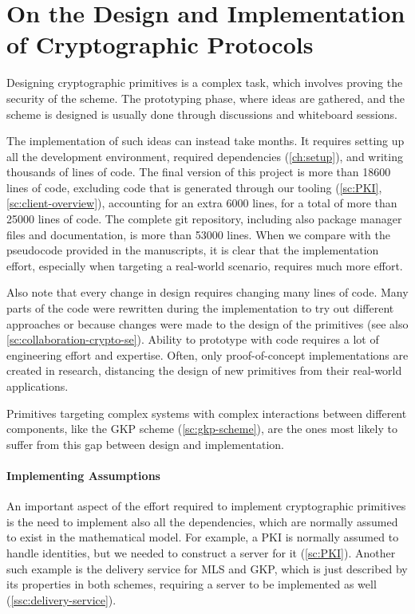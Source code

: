 \section{On the Design and Implementation of Cryptographic Protocols}\label{sc:gap-crypto-primitives-design-implementation}

Designing cryptographic primitives is a complex task,
which involves proving the security of the scheme. The prototyping phase, where ideas are gathered, 
and the scheme is designed is usually done through 
discussions and whiteboard sessions.

The implementation of such ideas can instead take months.
It requires setting up all the development environment,
required dependencies (\cref{ch:setup}), and writing thousands of lines of code.
The final version of this project 
is more than 18600 lines of code, excluding code that
is generated through our tooling (\cref{sc:PKI}, \cref{sc:client-overview}), 
accounting for an extra 6000 lines,
for a total of more than 25000 lines of code.
The complete git repository, including
also package manager files and documentation, 
is more than 53000 lines.
When we compare with the pseudocode provided in the manuscripts,
it is clear that the implementation effort, especially
when targeting a real-world scenario, requires much
more effort. 

Also note that every change in design requires
changing many lines of code. Many parts of the code
were rewritten during the implementation to try out
different approaches or because changes were made to the
design of the primitives (see also \cref{sc:collaboration-crypto-se}). 
Ability to prototype with
code requires a lot of engineering effort and
expertise. Often, only proof-of-concept
implementations are created in research,
distancing the design of new primitives from their
real-world applications.

Primitives targeting complex systems with complex interactions
between different components, like the GKP scheme (\cref{sc:gkp-scheme}), are the
ones most likely to suffer from this gap between design
and implementation.

\paragraph{Implementing Assumptions}
An important aspect of the effort required to implement
cryptographic primitives is the need to implement also
all the dependencies, which are normally assumed to exist
in the mathematical model. For example, a PKI is normally
assumed to handle identities, but we needed to construct a server for it (\cref{sc:PKI}).
Another such example is the delivery service for MLS and
GKP, which is just described by its properties in both schemes,
requiring a server to be implemented as well (\cref{ssc:delivery-service}).

